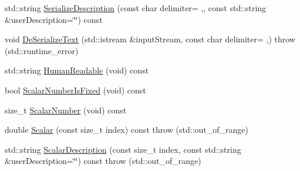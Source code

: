 \begin{DoxyCompactItemize}
\item 
std\+::string \hyperlink{classprm_fixture_gain_cartesian_set_a0765a09735ebf7b562741a331010ae1c}{Serialize\+Description} (const char delimiter= \textquotesingle{},\textquotesingle{}, const std\+::string \&user\+Description=\char`\"{}\char`\"{}) const 
\item 
void \hyperlink{classprm_fixture_gain_cartesian_set_a1e6e74e42eb35f5a2722debe34633069}{De\+Serialize\+Text} (std\+::istream \&input\+Stream, const char delimiter= \textquotesingle{},\textquotesingle{})  throw (std\+::runtime\+\_\+error)
\item 
std\+::string \hyperlink{classprm_fixture_gain_cartesian_set_aeac80367a951a1826a94c21f572d22c0}{Human\+Readable} (void) const 
\item 
bool \hyperlink{classprm_fixture_gain_cartesian_set_a27ca490abc1f87d6488450b4d7754d69}{Scalar\+Number\+Is\+Fixed} (void) const 
\item 
size\+\_\+t \hyperlink{classprm_fixture_gain_cartesian_set_aca12f9d304debca6f9db18edd095da5e}{Scalar\+Number} (void) const 
\item 
double \hyperlink{classprm_fixture_gain_cartesian_set_a1683e6337b51638c1cceab06978e6934}{Scalar} (const size\+\_\+t index) const   throw (std\+::out\+\_\+of\+\_\+range)
\item 
std\+::string \hyperlink{classprm_fixture_gain_cartesian_set_a155a4bfe0c7766d366c418f871f1a7d4}{Scalar\+Description} (const size\+\_\+t index, const std\+::string \&user\+Description=\char`\"{}\char`\"{}) const   throw (std\+::out\+\_\+of\+\_\+range)
\end{DoxyCompactItemize}
